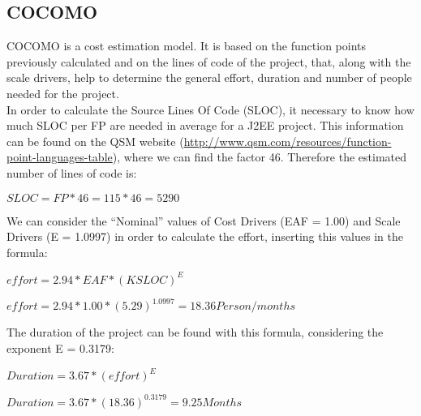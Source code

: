 	\subsection{COCOMO}
		COCOMO is a cost estimation model. It is based on the function points previously calculated and on the lines of code of the project, that, along with the scale drivers, help to determine the general effort, duration and number of people needed for the project.\\
		In order to calculate the Source Lines Of Code (SLOC), it necessary to know how much SLOC per FP are needed in average for a J2EE project. This information can be found on the QSM website (\url{http://www.qsm.com/resources/function-point-languages-table}), where we can find the factor 46. Therefore the estimated number of lines of code is:
		\vspace{0.5cm}	
		\begin{center}
			\begin{math}
				SLOC = FP * 46 = 115 * 46 = 5290
			\end{math}
		\end{center}
		\vspace{0.5cm}
		We can consider the “Nominal” values of Cost Drivers (EAF = 1.00) and Scale Drivers (E = 1.0997) in order to calculate the effort, inserting this values in the formula:
		\vspace{0.5cm}
		\begin{center}
			\begin{math}
				effort = 2.94*EAF*(KSLOC)^{E}
			\end{math}
		\end{center}
		\begin{center}
			\begin{math}
				effort = 2.94*1.00*(5.29)^{1.0997} = 18.36 Person/months
			\end{math}
		\end{center}
		\vspace{0.5cm}
		The duration of the project can be found with this formula, considering the exponent E = 0.3179:
		\vspace{0.5cm}
		\begin{center}
			\begin{math}
				Duration = 3.67*(effort)^{E}
			\end{math}
		\end{center}
		\begin{center}
			\begin{math}
				Duration = 3.67*(18.36)^{0.3179} = 9.25 Months
			\end{math}
		\end{center}
